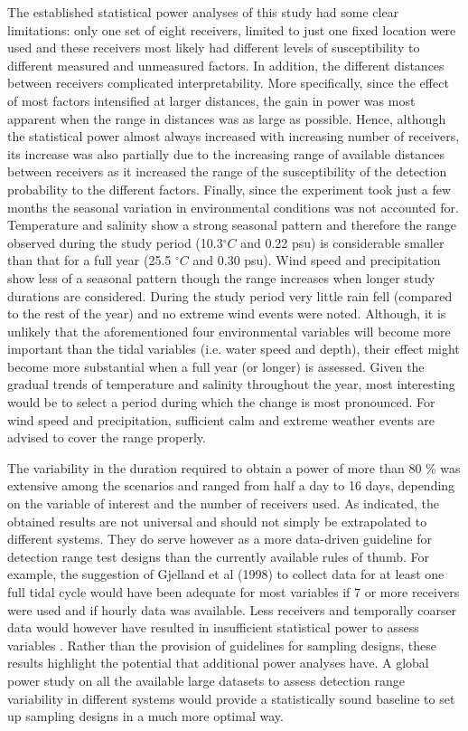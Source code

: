 \documentclass[doublespacing,linenumbers]{bmcart}
\begin{document}
The established statistical power analyses of this study had some clear limitations: only one set of eight receivers, limited to just one fixed location were used and these receivers most likely had different levels of susceptibility to different measured and unmeasured factors. In addition, the different distances between receivers complicated interpretability. More specifically, since the effect of most factors intensified at larger distances, the gain in power was most apparent when the range in distances was as large as possible. Hence, although the statistical power almost always increased with increasing number of receivers, its increase was also partially due to the increasing range of available distances between receivers as it increased the range of the susceptibility of the detection probability to the different factors. Finally, since the experiment took just a few months the seasonal variation in environmental conditions was not accounted for. Temperature and salinity show a strong seasonal pattern and therefore the range observed during the study period (10.3$^\circ C$ and 0.22 psu) is considerable smaller than that for a full year (25.5 $^\circ C$ and 0.30 psu). Wind speed and precipitation show less of a seasonal pattern though the range increases when longer study durations are considered. During the study period very little rain fell (compared to the rest of the year) and no extreme wind events were noted. Although, it is unlikely that the aforementioned four environmental variables will become more important than the tidal variables (i.e. water speed and depth), their effect might become more substantial when a full year (or longer) is assessed. Given the gradual trends of temperature and salinity throughout the year, most interesting would be to select a period during which the change is most pronounced. For wind speed and precipitation, sufficient calm and extreme weather events are advised to cover the range properly. 

The variability in the duration required to obtain a power of more than 80 \% was extensive among the scenarios and ranged from half a day to 16 days, depending on the variable of interest and the number of receivers used. As indicated, the obtained results are not universal and should not simply be extrapolated to different systems. They do serve however as a more data-driven guideline for detection range test designs than the currently available rules of thumb. For example, the suggestion of Gjelland et al (1998) to collect data for at least one full tidal cycle would have been adequate for most variables if 7 or more receivers were used and if hourly data was available. Less receivers and temporally coarser data would however have resulted in insufficient statistical power to assess variables \cite{Gjelland2013EnvironmentalTransmission}. Rather than the provision of guidelines for sampling designs, these results highlight the potential that additional power analyses have. A global power study on all the available large datasets to assess detection range variability in different systems would provide a statistically sound baseline to set up sampling designs in a much more optimal way. 
\end{document}
